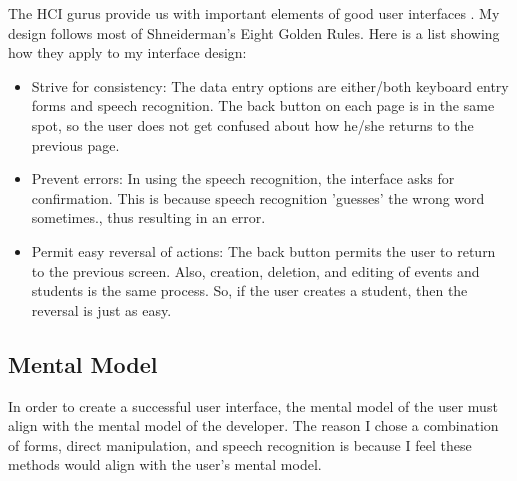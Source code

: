 \documentclass{article}
\begin{document}
The HCI gurus provide us with important elements of good user interfaces \cite{principles}.  My design follows most of Shneiderman's Eight Golden Rules.  Here is a list showing how they apply to my interface design:

\begin{itemize}
\item Strive for consistency:  The data entry options are either/both keyboard entry forms and speech recognition.  The back button on each page is in the same spot, so the user does not get confused about how he/she returns to the previous page.
\item Prevent errors: In using the speech recognition, the interface asks for confirmation.  This is because speech recognition 'guesses' the wrong word sometimes., thus resulting in an error.
\item Permit easy reversal of actions: The back button permits the user to return to the previous screen.  Also, creation, deletion, and editing of events and students is the same process.  So, if the user creates a student, then the reversal is just as easy.
\end{itemize}

\subsection{Mental Model}

In order to create a successful user interface, the mental model of the user must align with the mental model of the developer.  The reason I chose a combination of forms, direct manipulation, and speech recognition is because I feel these methods would align with the user's mental model.   



\end{document}
